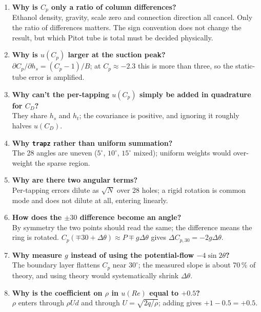 \documentclass[11pt,a4paper]{article}
\newcommand{\Cp}{\ensuremath{C_p}}
\newcommand{\CD}{\ensuremath{C_D}}
\newcommand{\ReD}{\ensuremath{\mathit{Re}}}
\begin{document}
\begin{enumerate}[leftmargin=1.6em,itemsep=4pt]
\item \textbf{Why is \Cp{} only a ratio of column differences?}\\
Ethanol density, gravity, scale zero and connection direction all cancel. Only the ratio of
differences matters. The sign convention does not change the result, but which Pitot tube is total
must be decided physically.

\item \textbf{Why is $u(\Cp)$ larger at the suction peak?}\\
$\partial \Cp/\partial h_s = (\Cp - 1)/B$; at $\Cp \approx -2.3$ this is more than three, so the
static-tube error is amplified.

\item \textbf{Why can't the per-tapping $u(\Cp)$ simply be added in quadrature for \CD?}\\
They share $h_s$ and $h_t$; the covariance is positive, and ignoring it roughly halves $u(\CD)$.

\item \textbf{Why \texttt{trapz} rather than uniform summation?}\\
The 28 angles are uneven ($5^\circ$, $10^\circ$, $15^\circ$ mixed); uniform weights would
over-weight the sparse region.

\item \textbf{Why are there two angular terms?}\\
Per-tapping errors dilute as $\sqrt{N}$ over 28 holes; a rigid rotation is common mode and does not
dilute at all, entering linearly.

\item \textbf{How does the $\pm30$ difference become an angle?}\\
By symmetry the two points should read the same; the difference means the ring is rotated.
$\Cp(\mp30 + \Delta\theta) \approx P \mp g\Delta\theta$ gives $\Delta C_{p,30} = -2g\Delta\theta$.

\item \textbf{Why measure $g$ instead of using the potential-flow $-4\sin 2\theta$?}\\
The boundary layer flattens \Cp{} near $30^\circ$; the measured slope is about 70\,\% of theory,
and using theory would systematically shrink $\Delta\theta$.

\item \textbf{Why is the coefficient on $\rho$ in $u(\ReD)$ equal to $+0.5$?}\\
$\rho$ enters through $\rho U d$ and through $U = \sqrt{2q/\rho}$; adding gives $+1 - 0.5 = +0.5$.


\end{enumerate}
\end{document}
